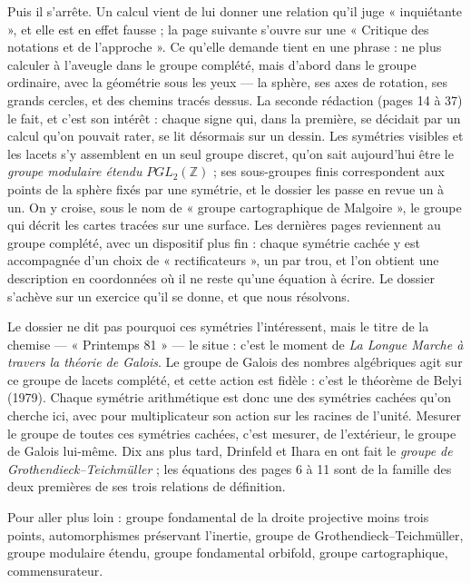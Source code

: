 \documentclass[11pt,a4paper]{article}
\begin{document}
\begin{resume}
Puis il s'arrête. Un calcul vient de lui donner une relation qu'il juge
« inquiétante », et elle est en effet fausse ; la page suivante s'ouvre sur une
« Critique des notations et de l'approche ». Ce qu'elle demande tient en une
phrase : ne plus calculer à l'aveugle dans le groupe complété, mais d'abord
dans le groupe ordinaire, avec la géométrie sous les yeux — la sphère, ses axes
de rotation, ses grands cercles, et des chemins tracés dessus. La seconde
rédaction (pages 14 à 37) le fait, et c'est son intérêt : chaque signe qui, dans
la première, se décidait par un calcul qu'on pouvait rater, se lit désormais
sur un dessin. Les symétries visibles et les lacets s'y assemblent en un seul
groupe discret, qu'on sait aujourd'hui être le \emph{groupe modulaire étendu}
$PGL_2(\mathbb{Z})$ ; ses sous-groupes finis correspondent aux points de la
sphère fixés par une symétrie, et le dossier les passe en revue un à un. On y
croise, sous le nom de « groupe cartographique de Malgoire », le groupe qui
décrit les cartes tracées sur une surface. Les dernières pages reviennent au
groupe complété, avec un dispositif plus fin : chaque symétrie cachée y est
accompagnée d'un choix de « rectificateurs », un par trou, et l'on obtient une
description en coordonnées où il ne reste qu'une équation à écrire. Le dossier
s'achève sur un exercice qu'il se donne, et que nous résolvons.

Le dossier ne dit pas pourquoi ces symétries l'intéressent, mais le titre de la
chemise — « Printemps 81 » — le situe : c'est le moment de \emph{La Longue
Marche à travers la théorie de Galois}. Le groupe de Galois des nombres
algébriques agit sur ce groupe de lacets complété, et cette action est
fidèle : c'est le théorème de Belyi (1979). Chaque symétrie arithmétique est
donc une des symétries cachées qu'on cherche ici, avec pour multiplicateur son
action sur les racines de l'unité. Mesurer le groupe de toutes ces symétries
cachées, c'est mesurer, de l'extérieur, le groupe de Galois lui-même. Dix ans
plus tard, Drinfeld et Ihara en ont fait le \emph{groupe de
Grothendieck--Teichmüller} ; les équations des pages 6 à 11 sont de la famille
des deux premières de ses trois relations de définition.

Pour aller plus loin : groupe fondamental de la droite projective moins trois
points, automorphismes préservant l'inertie, groupe de
Grothendieck--Teichmüller, groupe modulaire étendu, groupe fondamental
orbifold, groupe cartographique, commensurateur.

\end{resume}
\end{document}
